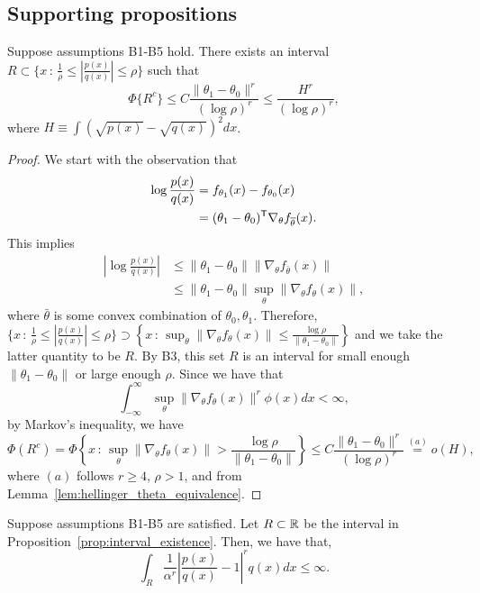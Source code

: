 \documentclass{article}
\begin{document}
\subsection{Supporting propositions}

\begin{proposition}
\label{prop:interval_existence}
Suppose assumptions B1-B5 hold. There exists an interval $R \subset \{ x \,:\, \frac{1}{\rho} \leq \left| \frac{p(x)}{q(x)} \right| \leq \rho \}$ such that
\[
\Phi \{ R^c \} \leq C \frac{ \| \theta_1 - \theta_0 \|^r }{ (\log \rho)^r } \leq \frac{H^r}{ (\log \rho)^r},
\]
where $H \equiv \int (\sqrt{p(x)} - \sqrt{q(x)} )^2 dx$. 
\end{proposition}

\begin{proof}
We start with the observation that
\begin{align*}
\log \frac{p(x)}{q(x)} &= f_{\theta_1}(x) - f_{\theta_0}(x)\\
           &= (\theta_1 - \theta_0)^{\mathsf{T}} \nabla_{\theta} f_{\overline{\theta}} (x).
\end{align*}
This implies 
\begin{align*}
\left | \log \frac{p(x)}{q(x)} \right | &\leq \| \theta_1 - \theta_0 \| \| \nabla_{\theta} f_{\bar{\theta}} (x) \| \\
                &\leq  \| \theta_1 - \theta_0 \| \sup_\theta \| \nabla_{\theta} f_{\theta} (x) \|,
\end{align*}
where $\bar{\theta}$ is some convex combination of $\theta_0, \theta_1$. Therefore,  
$ \{ x \,:\, \frac{1}{\rho} \leq \left| \frac{p(x)}{q(x)} \right| \leq \rho \} 
         \supset
   \left\{ x \,:\, \sup_\theta \| \nabla_{\theta} f_{\theta} (x) \| \leq \frac{\log \rho}{\| \theta_1 - \theta_0 \|} \right\}$ and we take the latter quantity to be $R$. By B3, this set $R$ is an interval for small enough $\| \theta_1 - \theta_0 \|$ or large enough $\rho$. Since we have that
\[
 \int_{-\infty}^{\infty} \sup_\theta \| \nabla_{\theta} f_{\theta}(x) \|^{r} \phi(x) dx < \infty,
\]
by Markov's inequality, we have
\[
\Phi(R^c) = \Phi \left\{ x \,:\, \sup_\theta \| \nabla_{\theta} f_{\theta}(x) \|  > \frac{\log \rho}{\| \theta_1 - \theta_0 \|} \right\}
    \leq C \frac{\| \theta_1 - \theta_0 \|^{r}}{(\log \rho)^{r}} \stackrel{(a)}= o(H),
\]
where $(a)$ follows $r \geq 4$, $\rho > 1$,  and from Lemma~\ref{lem:hellinger_theta_equivalence}.
\end{proof}




\begin{proposition}
\label{prop:theta_A3_bound}
Suppose assumptions B1-B5 are satisfied. Let $R \subset {\mathbb R}$ be the interval in Proposition~\ref{prop:interval_existence}. Then, we have that,
\[
\int_R \frac{1}{\alpha^r} \left| \frac{p(x)}{q(x)} - 1 \right|^r q(x) dx \leq \infty.
\]
\end{proposition}
\end{document}
